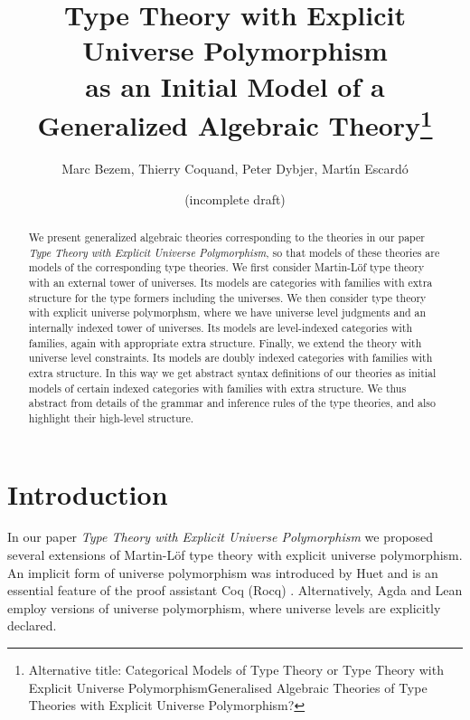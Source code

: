 \documentclass[11pt,a4paper]{article}
\theoremstyle{definition}
\begin{document}
\title{Type Theory
with Explicit Universe Polymorphism\\ as an Initial Model of a Generalized Algebraic Theory\footnote{Alternative title: Categorical Models of Type Theory or Type Theory
with Explicit Universe PolymorphismGeneralised Algebraic Theories of Type Theories with Explicit Universe Polymorphism?
}}

\author{Marc Bezem, Thierry Coquand, Peter Dybjer, Mart\'{\i}n Escard\'o}

\date{(incomplete draft)}
\maketitle

\begin{abstract}
We present generalized algebraic theories corresponding to the theories in our paper 
{\em Type Theory with Explicit Universe Polymorphism}, so that models of these theories are models of the corresponding type theories. We first consider Martin-Löf type theory with an external tower of universes. Its models are categories with families with extra structure for the type formers including the universes. We then consider type theory with explicit universe polymorphsm, where we have universe level judgments and an internally indexed tower of universes. Its models are level-indexed categories with families, again with appropriate extra structure. Finally, we extend the theory with universe level constraints. Its models are doubly indexed categories with families with extra structure. In this way we get abstract syntax definitions of our theories as initial models of certain indexed categories with families with extra structure. We thus abstract from details of the grammar and inference rules of the type theories, and also highlight their high-level structure.
\end{abstract}

\section{Introduction}

In our paper {\em Type Theory with Explicit Universe Polymorphism} \cite{BezemCDE22} we proposed several extensions of Martin-Löf type theory with explicit universe polymorphism. An implicit form of universe polymorphism was introduced by Huet \cite{Huet87} and is an essential feature of the proof assistant Coq (Rocq) \cite{coq}. Alternatively, Agda \cite{agda} and Lean \cite{lean} employ versions of universe polymorphism, where universe levels are explicitly declared. 
\end{document}
